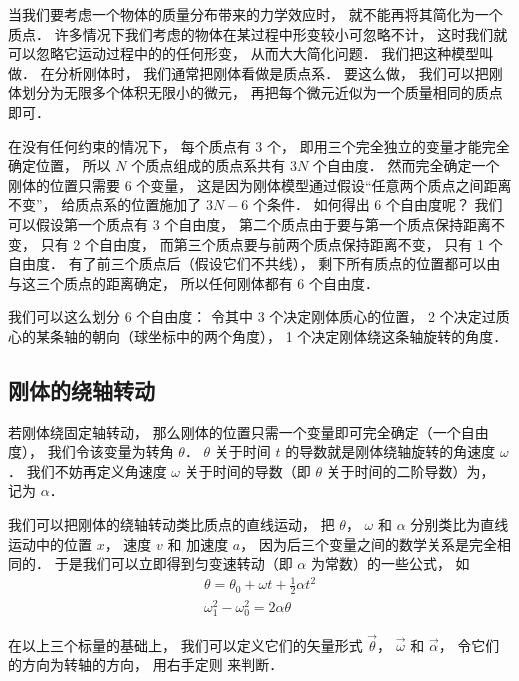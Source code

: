 

当我们要考虑一个物体的质量分布带来的力学效应时， 就不能再将其简化为一个质点． 许多情况下我们考虑的物体在某过程中形变较小可忽略不计， 这时我们就可以忽略它运动过程中的的任何形变， 从而大大简化问题． 我们把这种模型叫做． 在分析刚体时， 我们通常把刚体看做是质点系． 要这么做， 我们可以把刚体划分为无限多个体积无限小的微元， 再把每个微元近似为一个质量相同的质点即可． 

在没有任何约束的情况下， 每个质点有 3 个， 即用三个完全独立的变量才能完全确定位置， 所以 $N$ 个质点组成的质点系共有 $3N$ 个自由度． 然而完全确定一个刚体的位置只需要 6 个变量， 这是因为刚体模型通过假设“任意两个质点之间距离不变”， 给质点系的位置施加了 $3N - 6$ 个条件． 如何得出 6 个自由度呢？ 我们可以假设第一个质点有 3 个自由度， 第二个质点由于要与第一个质点保持距离不变， 只有 2 个自由度， 而第三个质点要与前两个质点保持距离不变， 只有 1 个自由度． 有了前三个质点后（假设它们不共线）， 剩下所有质点的位置都可以由与这三个质点的距离确定， 所以任何刚体都有 6 个自由度．

我们可以这么划分 6 个自由度： 令其中 3 个决定刚体质心的位置， 2 个决定过质心的某条轴的朝向（球坐标中的两个角度）， 1 个决定刚体绕这条轴旋转的角度．

\subsection{刚体的绕轴转动}

若刚体绕固定轴转动， 那么刚体的位置只需一个变量即可完全确定（一个自由度）， 我们令该变量为转角 $\theta$． $\theta$ 关于时间 $t$ 的导数就是刚体绕轴旋转的角速度 $\omega$． 我们不妨再定义角速度 $\omega$ 关于时间的导数（即 $\theta$ 关于时间的二阶导数）为， 记为 $\alpha$．

我们可以把刚体的绕轴转动类比质点的直线运动， 把 $\theta$， $\omega$ 和 $\alpha$ 分别类比为直线运动中的位置 $x$， 速度 $v$ 和 加速度 $a$， 因为后三个变量之间的数学关系是完全相同的． 于是我们可以立即得到匀变速转动（即 $\alpha$ 为常数）的一些公式， 如
\begin{gather}
\theta = \theta_0 + \omega t + \frac12 \alpha t^2\\
\omega_1^2 - \omega_0^2 = 2\alpha \theta
\end{gather}

在以上三个标量的基础上， 我们可以定义它们的矢量形式 $\vec \theta$， $\vec \omega$ 和 $\vec \alpha$， 令它们的方向为转轴的方向， 用右手定则 来判断．


